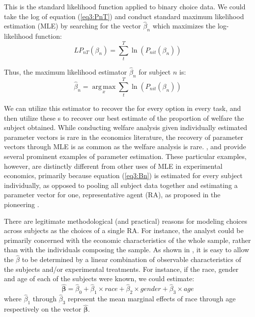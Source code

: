 \documentclass[../main.tex]{subfiles}
\begin{document}
\noindent This is the standard likelihood function applied to binary choice data.
We could take the log of equation (\ref{eq3:PnT}) and conduct standard maximum likelihood estimation (MLE) by searching for the vector $\hat{\beta}_n$ which maximizes the log-likelihood function:
\begin{equation}
	\label{eq3:LPnT}
	\mathit{LP}_{nT}(\beta_n) = \sum_{t}^{T} \ln \left( P_{nit}(\beta_n) \right)
\end{equation}

\noindent Thus, the maximum likelihood estimator $\hat{\beta}_n$ for subject $n$ is:
\begin{equation}
	\label{eq3:Bn}
	\hat{\beta}_n = \underset{x}{\operatorname{arg\,max}}\sum_t^T \ln \left( P_{nit}(\beta_n) \right)
\end{equation}

We can utilize this estimator to recover the {\CE} for every option in every task, and then utilize these \CE s to recover our best estimate of the proportion of welfare the subject obtained. 
While conducting welfare analysis given individually estimated parameter vectors is rare in the economics literature,{\footnotemark} the recovery of parameter vectors through MLE is as common as the welfare analysis is rare.
\textcite{Hey1994}, \textcite{Wilcox2015} and \textcite{Hey2001} provide several prominent examples of parameter estimation.
These particular examples, however, are distinctly different from other uses of MLE in experimental economics, primarily because equation (\ref{eq3:Bn}) is estimated for every subject individually, as opposed to pooling all subject data together and estimating a parameter vector for one, representative agent (RA), as proposed in the pioneering \textcite{Camerer1994}.

\addtocounter{footnote}{-1}




There are legitimate methodological (and practical) reasons for modeling choices across subjects as the choices of a single RA.
For instance, the analyst could be primarily concerned with the economic characteristics of the whole sample, rather than with the individuals composing the sample.
As shown in \textcite[142]{Harrison2008a}, it is easy to allow the $\hat{\beta}$ to be determined by a linear combination of observable characteristics of the subjects and/or experimental treatments.
For instance, if the race, gender and age of each of the subjects were known, we could estimate:
\begin{equation}
	\label{eq3:BB}
	\bm{\hat{\beta}} = \hat{\beta}_0 + \hat{\beta}_1 \times \mathit{race} + \hat{\beta}_2 \times \mathit{gender} + \hat{\beta}_3 \times \mathit{age}
\end{equation}
\noindent where $\hat{\beta}_1$ through $\hat{\beta}_3$ represent the mean marginal effects{\footnotemark} of race through age respectively on the vector $\bm{\hat{\beta}}$.
\end{document}
